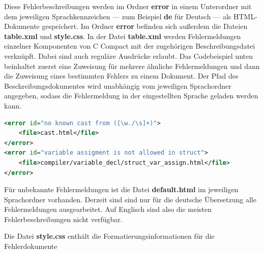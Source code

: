 Diese Fehlerbeschreibungen werden im Ordner \textbf{error} in einem Unterordner mit dem jeweiligen Sprachkennzeichen --- zum Beispiel \textbf{de} für Deutsch --- als HTML-Dokumente gespeichert. Im Ordner \textbf{error} befinden sich außerdem die Dateien \textbf{table.xml} und \textbf{style.css}. In der Datei \textbf{table.xml} werden Fehlermeldungen einzelner Komponenten von C Compact mit der zugehörigen Beschreibungsdatei verknüpft. Dabei sind auch reguläre Ausdrücke erlaubt. Das Codebeispiel unten beinhaltet zuerst eine Zuweisung für mehrere ähnliche Fehlermeldungen und dann die Zuweisung eines bestimmten Fehlers zu einem Dokument. Der Pfad des Beschreibungsdokumentes wird unabhängig vom jeweiligen Sprachordner angegeben, sodass die Fehlermeldung in der eingestellten Sprache geladen werden kann.
\begin{lstlisting}[language=XML]
<error id="no known cast from ([\w./\s]+)">
	<file>cast.html</file>
</error>
<error id="variable assigment is not allowed in struct">
	<file>compiler/variable_decl/struct_var_assign.html</file>
</error>
\end{lstlisting}

Für unbekannte Fehlermeldungen ist die Datei \textbf{default.html} im jeweiligen Sprachordner vorhanden. Derzeit sind sind nur für die deutsche Übersetzung alle Fehlermeldungen ausgearbeitet. Auf Englisch sind also die meisten Fehlerbeschreibungen nicht verfügbar.

Die Datei \textbf{style.css} enthält die Formatierungsinformationen für die Fehlerdokumente


